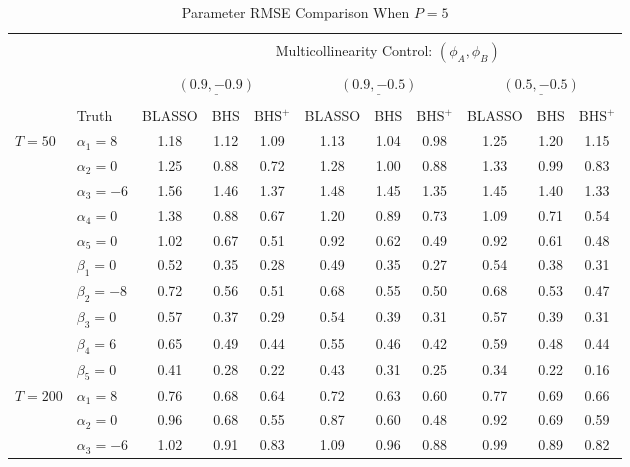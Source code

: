 \begin{table}[htbp]
\scriptsize
\centering
\caption{Parameter RMSE Comparison When $P=5$}
\begin{tabular}{ll|ccc|ccc|ccc}
  \hline
  \multicolumn{2}{c|}{} & \multicolumn{9}{c}{}\\
  & & & \multicolumn{7}{c}{Multicollinearity Control: $(\phi_A,\phi_B)$} &  \\
  \multicolumn{2}{c|}{} & \multicolumn{9}{c}{}\\
   & & \multicolumn{3}{c}{$\underline{(0.9 ,-0.9)} $} & \multicolumn{3}{c}{$\underline{(0.9 ,-0.5)} $} & \multicolumn{3}{c}{$\underline{(0.5 ,-0.5)} $}   \\
  \multicolumn{2}{c|}{} & \multicolumn{9}{c}{}\\
& Truth & BLASSO & BHS & $\textrm{BHS}^+$ & BLASSO & BHS & $\textrm{BHS}^+$ & BLASSO & BHS & $\textrm{BHS}^+$ \\ 
  \hline
 \multirow{10}{*}{$T=50$} & $\alpha_1=8$ & 1.18 & 1.12 & 1.09 & 1.13 & 1.04 & 0.98 & 1.25 & 1.20 & 1.15 \\ 
  & $\alpha_2=0$ & 1.25 & 0.88 & 0.72 & 1.28 & 1.00 & 0.88 & 1.33 & 0.99 & 0.83 \\ 
  & $\alpha_3=-6$ & 1.56 & 1.46 & 1.37 & 1.48 & 1.45 & 1.35 & 1.45 & 1.40 & 1.33 \\ 
  & $\alpha_4=0$ & 1.38 & 0.88 & 0.67 & 1.20 & 0.89 & 0.73 & 1.09 & 0.71 & 0.54 \\ 
  & $\alpha_5=0$ & 1.02 & 0.67 & 0.51 & 0.92 & 0.62 & 0.49 & 0.92 & 0.61 & 0.48 \\ 
  & $\beta_1=0$ & 0.52 & 0.35 & 0.28 & 0.49 & 0.35 & 0.27 & 0.54 & 0.38 & 0.31 \\ 
  & $\beta_2=-8$ & 0.72 & 0.56 & 0.51 & 0.68 & 0.55 & 0.50 & 0.68 & 0.53 & 0.47 \\ 
  & $\beta_3=0$ & 0.57 & 0.37 & 0.29 & 0.54 & 0.39 & 0.31 & 0.57 & 0.39 & 0.31 \\ 
  & $\beta_4=6$ & 0.65 & 0.49 & 0.44 & 0.55 & 0.46 & 0.42 & 0.59 & 0.48 & 0.44 \\ 
  & $\beta_5=0$ & 0.41 & 0.28 & 0.22 & 0.43 & 0.31 & 0.25 & 0.34 & 0.22 & 0.16 \\
  \hline 
  \multirow{10}{*}{$T=200$} & $\alpha_1=8$ & 0.76 & 0.68 & 0.64 & 0.72 & 0.63 & 0.60 & 0.77 & 0.69 & 0.66 \\ 
  & $\alpha_2=0$ & 0.96 & 0.68 & 0.55 & 0.87 & 0.60 & 0.48 & 0.92 & 0.69 & 0.59 \\ 
  & $\alpha_3=-6$ & 1.02 & 0.91 & 0.83 & 1.09 & 0.96 & 0.88 & 0.99 & 0.89 & 0.82 \\ 

\end{tabular}
\end{table}
